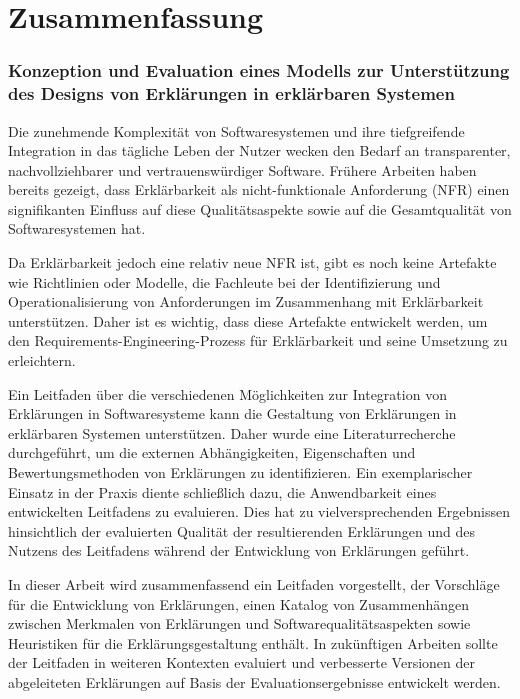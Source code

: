 \chapter*{Zusammenfassung}

\subsection*{Konzeption und Evaluation eines Modells zur Unterstützung des Designs von Erklärungen in erklärbaren Systemen}

Die zunehmende Komplexität von Softwaresystemen und ihre tiefgreifende Integration in das tägliche Leben der Nutzer wecken den Bedarf an transparenter, nachvollziehbarer und vertrauenswürdiger Software. Frühere Arbeiten haben bereits gezeigt, dass Erklärbarkeit als nicht-funktionale Anforderung (NFR) einen signifikanten Einfluss auf diese Qualitätsaspekte sowie auf die Gesamtqualität von Softwaresystemen hat.

Da Erklärbarkeit jedoch eine relativ neue NFR ist, gibt es noch keine Artefakte wie Richtlinien oder Modelle, die Fachleute bei der Identifizierung und Operationalisierung von Anforderungen im Zusammenhang mit Erklärbarkeit unterstützen. Daher ist es wichtig, dass diese Artefakte entwickelt werden, um den Requirements-Engineering-Prozess für Erklärbarkeit und seine Umsetzung zu erleichtern.

Ein Leitfaden über die verschiedenen Möglichkeiten zur Integration von Erklärungen in Softwaresysteme kann die Gestaltung von Erklärungen in erklärbaren Systemen unterstützen. Daher wurde eine Literaturrecherche durchgeführt, um die externen Abhängigkeiten, Eigenschaften und Bewertungsmethoden von Erklärungen zu identifizieren. Ein exemplarischer Einsatz in der Praxis diente schließlich dazu, die Anwendbarkeit eines entwickelten Leitfadens zu evaluieren. Dies hat zu vielversprechenden Ergebnissen hinsichtlich der evaluierten Qualität der resultierenden Erklärungen und des Nutzens des Leitfadens während der Entwicklung von Erklärungen geführt.

In dieser Arbeit wird zusammenfassend ein Leitfaden vorgestellt, der Vorschläge für die Entwicklung von Erklärungen, einen Katalog von Zusammenhängen zwischen Merkmalen von Erklärungen und Softwarequalitätsaspekten sowie Heuristiken für die Erklärungsgestaltung enthält. In zukünftigen Arbeiten sollte der Leitfaden in weiteren Kontexten evaluiert und verbesserte Versionen der abgeleiteten Erklärungen auf Basis der Evaluationsergebnisse entwickelt werden.

